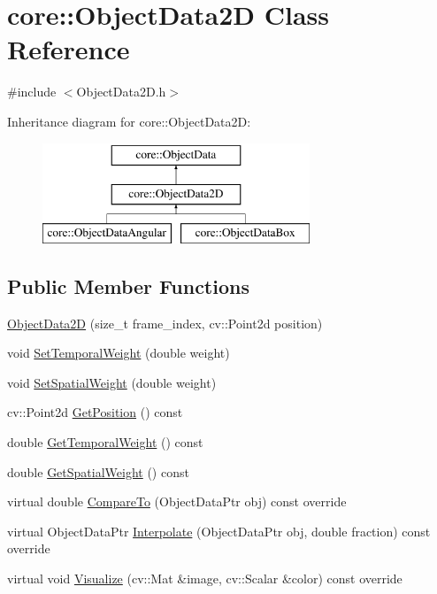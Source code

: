 \hypertarget{classcore_1_1ObjectData2D}{}\section{core\+:\+:Object\+Data2D Class Reference}
\label{classcore_1_1ObjectData2D}


{\ttfamily \#include $<$Object\+Data2\+D.\+h$>$}

Inheritance diagram for core\+:\+:Object\+Data2D\+:\begin{figure}[H]
\begin{center}
\leavevmode
\includegraphics[height=3.000000cm]{classcore_1_1ObjectData2D}
\end{center}
\end{figure}
\subsection*{Public Member Functions}
\begin{DoxyCompactItemize}
\item 
\hyperlink{classcore_1_1ObjectData2D_adc35e5b8597ea47ad3568259c2e800c6}{Object\+Data2D} (size\+\_\+t frame\+\_\+index, cv\+::\+Point2d position)
\item 
void \hyperlink{classcore_1_1ObjectData2D_a2850785393bc7a5250427bbda84c1b58}{Set\+Temporal\+Weight} (double weight)
\item 
void \hyperlink{classcore_1_1ObjectData2D_ad62bf8b2362e8f3547f8040a144fa346}{Set\+Spatial\+Weight} (double weight)
\item 
cv\+::\+Point2d \hyperlink{classcore_1_1ObjectData2D_a29f86d082602a53722f1139058b2de79}{Get\+Position} () const 
\item 
double \hyperlink{classcore_1_1ObjectData2D_a8c783114ee2ffdc621620019d23175c1}{Get\+Temporal\+Weight} () const 
\item 
double \hyperlink{classcore_1_1ObjectData2D_a537e36b33048c37cabf65532954eb6e9}{Get\+Spatial\+Weight} () const 
\item 
virtual double \hyperlink{classcore_1_1ObjectData2D_a68d56bd5f26a41830a87ae32eabf9126}{Compare\+To} (Object\+Data\+Ptr obj) const override
\item 
virtual Object\+Data\+Ptr \hyperlink{classcore_1_1ObjectData2D_a59b974e09f74f0a2640e3152893fe79f}{Interpolate} (Object\+Data\+Ptr obj, double fraction) const override
\item 
virtual void \hyperlink{classcore_1_1ObjectData2D_aff4e8539559f4ce50a7f43b733d6c512}{Visualize} (cv\+::\+Mat \&image, cv\+::\+Scalar \&color) const override
\end{DoxyCompactItemize}


